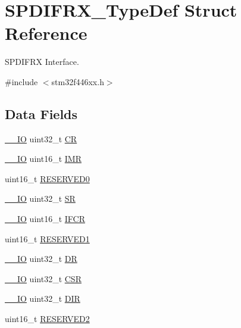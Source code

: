 \hypertarget{struct_s_p_d_i_f_r_x___type_def}{}\section{S\+P\+D\+I\+F\+R\+X\+\_\+\+Type\+Def Struct Reference}
\label{struct_s_p_d_i_f_r_x___type_def}


S\+P\+D\+I\+F\+RX Interface.  




{\ttfamily \#include $<$stm32f446xx.\+h$>$}

\subsection*{Data Fields}
\begin{DoxyCompactItemize}
\item 
\hyperlink{core__sc300_8h_aec43007d9998a0a0e01faede4133d6be}{\+\_\+\+\_\+\+IO} uint32\+\_\+t \hyperlink{struct_s_p_d_i_f_r_x___type_def_ab40c89c59391aaa9d9a8ec011dd0907a}{CR}
\item 
\hyperlink{core__sc300_8h_aec43007d9998a0a0e01faede4133d6be}{\+\_\+\+\_\+\+IO} uint16\+\_\+t \hyperlink{struct_s_p_d_i_f_r_x___type_def_af29a8211f72bbda9316551ea02ae4b37}{I\+MR}
\item 
uint16\+\_\+t \hyperlink{struct_s_p_d_i_f_r_x___type_def_a149feba01f9c4a49570c6d88619f504f}{R\+E\+S\+E\+R\+V\+E\+D0}
\item 
\hyperlink{core__sc300_8h_aec43007d9998a0a0e01faede4133d6be}{\+\_\+\+\_\+\+IO} uint32\+\_\+t \hyperlink{struct_s_p_d_i_f_r_x___type_def_af6aca2bbd40c0fb6df7c3aebe224a360}{SR}
\item 
\hyperlink{core__sc300_8h_aec43007d9998a0a0e01faede4133d6be}{\+\_\+\+\_\+\+IO} uint16\+\_\+t \hyperlink{struct_s_p_d_i_f_r_x___type_def_a3a5a3a6154d16d0a8d2f25b0ac3237a7}{I\+F\+CR}
\item 
uint16\+\_\+t \hyperlink{struct_s_p_d_i_f_r_x___type_def_a8249a3955aace28d92109b391311eb30}{R\+E\+S\+E\+R\+V\+E\+D1}
\item 
\hyperlink{core__sc300_8h_aec43007d9998a0a0e01faede4133d6be}{\+\_\+\+\_\+\+IO} uint32\+\_\+t \hyperlink{struct_s_p_d_i_f_r_x___type_def_a3df0d8dfcd1ec958659ffe21eb64fa94}{DR}
\item 
\hyperlink{core__sc300_8h_aec43007d9998a0a0e01faede4133d6be}{\+\_\+\+\_\+\+IO} uint32\+\_\+t \hyperlink{struct_s_p_d_i_f_r_x___type_def_a876dd0a8546697065f406b7543e27af2}{C\+SR}
\item 
\hyperlink{core__sc300_8h_aec43007d9998a0a0e01faede4133d6be}{\+\_\+\+\_\+\+IO} uint32\+\_\+t \hyperlink{struct_s_p_d_i_f_r_x___type_def_a7bad11e3dbbfcc3c1317dc68669d3f51}{D\+IR}
\item 
uint16\+\_\+t \hyperlink{struct_s_p_d_i_f_r_x___type_def_a5573848497a716a9947fd87487709feb}{R\+E\+S\+E\+R\+V\+E\+D2}
\end{DoxyCompactItemize}


